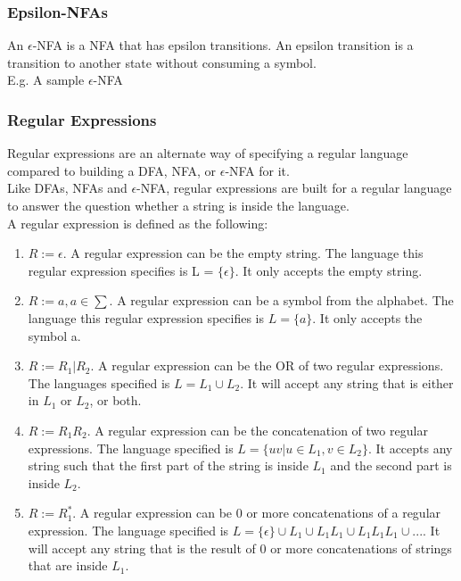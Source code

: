 \documentclass[12pt, letterpaper]{article}
\begin{document}
\subsubsection{Epsilon-NFAs}
An \(\epsilon\)-NFA is a NFA that has epsilon transitions. An epsilon transition is a transition to another state without consuming a symbol.\\

E.g. A sample \(\epsilon\)-NFA

\begin{center}
\end{center}

\subsubsection{Regular Expressions}
Regular expressions are an alternate way of specifying a regular language compared to building a DFA, NFA, or \(\epsilon\)-NFA for it.\\

Like DFAs, NFAs and \(\epsilon\)-NFA, regular expressions are built for a regular language to answer the question whether a string is inside the language.\\

A regular expression is defined as the following:
\begin{enumerate}
\item \(R := \epsilon\). A regular expression can be the empty string. The language this regular expression specifies is L = \(\{\epsilon\}\). It only accepts the empty string.
\item \(R := a, a \in \sum\). A regular expression can be a symbol from the alphabet. The language this regular expression specifies is \(L = \{a\}\). It only accepts the symbol a.
\item \(R := R_1|R_2\). A regular expression can be the OR of two regular expressions. The languages specified is \(L = L_1 \cup L_2\). It will accept any string that is either in \(L_1\) or \(L_2\), or both.
\item \(R := R_1 R_2\). A regular expression can be the concatenation of two regular expressions. The language specified is \(L = \{uv | u \in L_1, v \in L_2\}\). It accepts any string such that the first part of the string is inside \(L_1\) and the second part is inside \(L_2\).
\item \(R := R_1^*\). A regular expression can be 0 or more concatenations of a regular expression. The language specified is \(L = \{\epsilon\} \cup L_1 \cup L_1L_1 \cup L_1L_1L_1 \cup ...\). It will accept any string that is the result of 0 or more concatenations of strings that are inside \(L_1\).
\end{enumerate}
\end{document}

